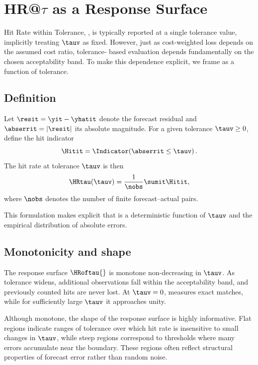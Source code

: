 \section{HR@\(\tau\) as a Response Surface}
\label{sec:response_surface}

Hit Rate within Tolerance, \HRtau{}, is typically reported at a single tolerance
value, implicitly treating $\tauv$ as fixed.
However, just as cost-weighted loss depends on the assumed cost ratio, tolerance-
based evaluation depends fundamentally on the chosen acceptability band.
To make this dependence explicit, we frame \HRtau{} as a function of tolerance.

\subsection{Definition}
\label{subsec:hrtau_definition}

Let $\resit = \yit - \yhatit$ denote the forecast residual and
$\abserrit = |\resit|$ its absolute magnitude.
For a given tolerance $\tauv \ge 0$, define the hit indicator
\[
    \Hitit = \Indicator\!\left( \abserrit \le \tauv \right).
\]
The hit rate at tolerance $\tauv$ is then
\[
    \HRtau(\tauv)
    =
    \frac{1}{\nobs}
    \sumit \Hitit,
\]
where $\nobs$ denotes the number of finite forecast--actual pairs.

This formulation makes explicit that \HRtau{} is a deterministic function of
$\tauv$ and the empirical distribution of absolute errors.

\subsection{Monotonicity and shape}
\label{subsec:monotonicity}

The response surface $\HRoftau{}$ is monotone non-decreasing in $\tauv$.
As tolerance widens, additional observations fall within the acceptability band,
and previously counted hits are never lost.
At $\tauv = 0$, \HRtau{} measures exact matches, while for sufficiently large
$\tauv$ it approaches unity.

Although monotone, the shape of the response surface is highly informative.
Flat regions indicate ranges of tolerance over which hit rate is insensitive to
small changes in $\tauv$, while steep regions correspond to thresholds where many
errors accumulate near the boundary.
These regions often reflect structural properties of forecast error rather than
random noise.

